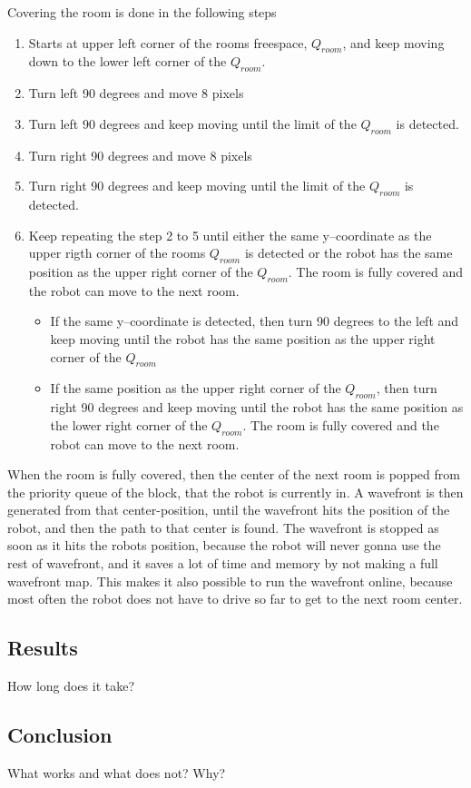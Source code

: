 Covering the room is done in the following steps
\begin{enumerate}\itemsep-2pt
\item Starts at upper left corner of the rooms freespace, $Q_{room}$, and keep moving down to the lower left corner of the $Q_{room}$.
\item Turn left 90 degrees and move 8 pixels
\item Turn left 90 degrees and keep moving until the limit of the $Q_{room}$ is detected.
\item Turn right 90 degrees and move 8 pixels
\item Turn right 90 degrees and keep moving until the limit of the $Q_{room}$ is detected.
\item Keep repeating the step 2 to 5 until either the same y--coordinate as the upper rigth corner of the rooms $Q_{room}$ is detected or the robot has the same position as the upper right corner of the $Q_{room}$. The room is fully covered and the robot can move to the next room.   
\begin{itemize}\itemsep-2pt  
\item If the same y--coordinate is detected, then turn 90 degrees to the left and keep moving until the robot has the same position as the upper right corner of the $Q_{room}$
\item If the same position as the upper right corner of the $Q_{room}$, then turn right 90 degrees and keep moving until the robot has the same position as the lower right corner of the $Q_{room}$. The room is fully covered and the robot can move to the next room. 
\end{itemize}
\end{enumerate} 
When the room is fully covered, then the center of the next room is popped from the priority queue of the block, that the robot is currently in. A wavefront is then generated from that center-position, until the wavefront hits the position of the robot, and then the path to that center is found. The wavefront is stopped as soon as it hits the robots position, because the robot will never gonna use the rest of wavefront, and it saves a lot of time and memory by not making a full wavefront map. This makes it also possible to run the wavefront online, because most often the robot does not have to drive so far to get to the next room center. 

\subsection{Results}
How long does it take?

\subsection{Conclusion}
What works and what does not? Why?
